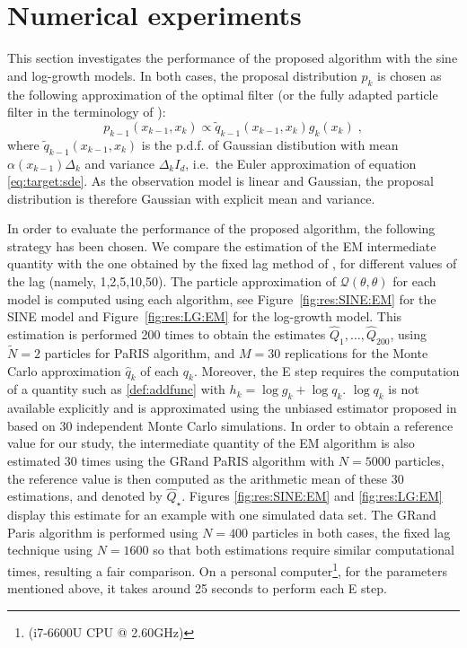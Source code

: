 \documentclass[12pt]{article}
\newcommand{\eqsp}{\;}
\newcommand{\1}{\mathrm{1}}
\newcommand{\hQ}{\widehat{Q}}
\begin{document}
\section{Numerical experiments}
\label{sec:exp}
This section investigates the performance of the proposed algorithm with the sine and log-growth models. 
In both cases, the proposal distribution $p_k$ is chosen as the following approximation of the optimal filter (or the fully adapted particle filter in the terminology of \cite{pitt:shephard:1999}): 
$$p_{k-1}(x_{k-1},x_k)\propto \tilde{q}_{k-1}(x_{k-1}, x_k)g_k(x_{k})\eqsp,$$
where $\tilde{q}_{k-1}(x_{k-1},x_k)$ is the p.d.f. of Gaussian distibution with mean $\alpha(x_{k-1})\Delta_k$ and variance $\Delta_kI_d$, i.e.\ the Euler approximation of equation \eqref{eq:target:sde}. 
As the observation model is linear and Gaussian, the proposal distribution is therefore Gaussian with explicit mean and variance.


In order to evaluate the performance of the proposed algorithm, the following strategy has been chosen. 
We compare the estimation of the EM intermediate quantity with the one obtained by the fixed lag method of \cite{olsson:strojby:2011}, for different values of the lag (namely, 1,2,5,10,50). 
The particle approximation of $\mathcal{Q}(\theta,\theta)$ for each model  is computed using each algorithm, see Figure~\ref{fig:res:SINE:EM} for the SINE model and Figure~\ref{fig:res:LG:EM} for the log-growth model. 
This estimation is performed 200 times to obtain the estimates $\hQ_1,\dots,\hQ_{200}$, using $\tilde{N}=2$ particles for PaRIS algorithm, and $M=30$ replications for the Monte Carlo approximation $\widehat q_k$ of each $q_k$.  
Moreover, the E step requires the computation of a quantity such as \eqref{def:addfunc} with $h_k= \log g_k + \log q_k$.  $\log q_k$ is not available explicitly and is approximated using the unbiased estimator proposed in \cite[Appendix B]{olsson:strojby:2011} based on 30 independent Monte Carlo simulations.
In order to obtain a reference value for our study, the intermediate quantity of the EM algorithm is also estimated 30 times using the GRand PaRIS algorithm with $N=5000$ particles, the reference value is then computed as the arithmetic mean of these 30 estimations, and denoted by $\hQ_\star$. 
Figures \ref{fig:res:SINE:EM} and \ref{fig:res:LG:EM} display this estimate for an example with one simulated data set. 
The GRand Paris algorithm is performed using $N=400$ particles in both cases, the fixed lag technique using $N=1600$ so that both estimations require similar computational times, resulting a fair comparison. On a personal computer\footnote{(i7-6600U CPU @ 2.60GHz)}, for the parameters mentioned above, it takes around 25 seconds to perform each E step. 
\end{document}
